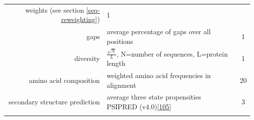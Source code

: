 \documentclass[12pt,a4paper,twoside]{book}
\theoremstyle{definition}
\theoremstyle{definition}
\theoremstyle{remark}
\begin{document}
\begin{longtable}[]{@{}rlc@{}}
\begin{minipage}[t]{0.50\columnwidth}
weights (see section \ref{seq-reweighting})\strut
\end{minipage} & \begin{minipage}[t]{0.18\columnwidth}\centering\strut
1\strut
\end{minipage}\tabularnewline
\begin{minipage}[t]{0.23\columnwidth}\raggedleft\strut
gaps\strut
\end{minipage} & \begin{minipage}[t]{0.50\columnwidth}\raggedright\strut
average percentage of gaps over all positions\strut
\end{minipage} & \begin{minipage}[t]{0.18\columnwidth}\centering\strut
1\strut
\end{minipage}\tabularnewline
\begin{minipage}[t]{0.23\columnwidth}\raggedleft\strut
diversity\strut
\end{minipage} & \begin{minipage}[t]{0.50\columnwidth}\raggedright\strut
\(\frac{\sqrt{N}}{L}\), N=number of sequences, L=protein length\strut
\end{minipage} & \begin{minipage}[t]{0.18\columnwidth}\centering\strut
1\strut
\end{minipage}\tabularnewline
\begin{minipage}[t]{0.23\columnwidth}\raggedleft\strut
amino acid composition\strut
\end{minipage} & \begin{minipage}[t]{0.50\columnwidth}\raggedright\strut
weighted amino acid frequencies in alignment\strut
\end{minipage} & \begin{minipage}[t]{0.18\columnwidth}\centering\strut
20\strut
\end{minipage}\tabularnewline
\begin{minipage}[t]{0.23\columnwidth}\raggedleft\strut
secondary structure prediction\strut
\end{minipage} & \begin{minipage}[t]{0.50\columnwidth}\raggedright\strut
average three state propensities PSIPRED
(v4.0){[}\protect\hyperlink{ref-Jones1999}{105}{]}\strut
\end{minipage} & \begin{minipage}[t]{0.18\columnwidth}\centering\strut
3\strut
\end{minipage}\tabularnewline
\begin{minipage}[t]{0.23\columnwidth}\raggedleft\strut

\end{minipage}
\end{longtable}
\end{document}
